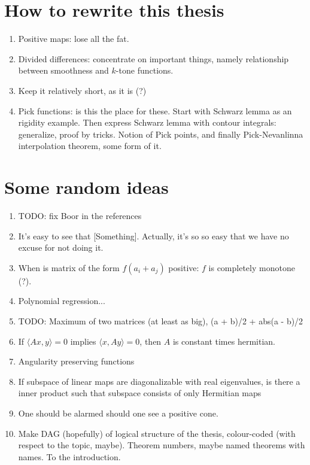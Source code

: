 \section{How to rewrite this thesis}

\begin{enumerate}
	\item Positive maps: lose all the fat.
	\item Divided differences: concentrate on important things, namely relationship between smoothness and $k$-tone functions.
	\item Keep it relatively short, as it is (?)
	\item Pick functions: is this the place for these. Start with Schwarz lemma as an rigidity example. Then express Schwarz lemma with contour integrals: generalize, proof by tricks. Notion of Pick points, and finally Pick-Nevanlinna interpolation theorem, some form of it.
\end{enumerate}

\section{Some random ideas}
\begin{enumerate}
	\item TODO: fix Boor in the references
	\item It's easy to see that [Something]. Actually, it's so so easy that we have no excuse for not doing it.
	\item When is matrix of the form $f(a_{i} + a_{j})$ positive: $f$ is completely monotone (?).
	\item Polynomial regression...
	\item TODO: Maximum of two matrices (at least as big), (a + b)/2 + abs(a - b)/2
	\item If $\langle A x, y \rangle = 0$ implies $\langle x, A y \rangle = 0$, then $A$ is constant times hermitian.
	\item Angularity preserving functions
	\item If subspace of linear maps are diagonalizable with real eigenvalues, is there a inner product such that subspace consists of only Hermitian maps
	\item One should be alarmed should one see a positive cone.
	\item Make DAG (hopefully) of logical structure of the thesis, colour-coded (with respect to the topic, maybe). Theorem numbers, maybe named theorems with names. To the introduction.
\end{enumerate}


